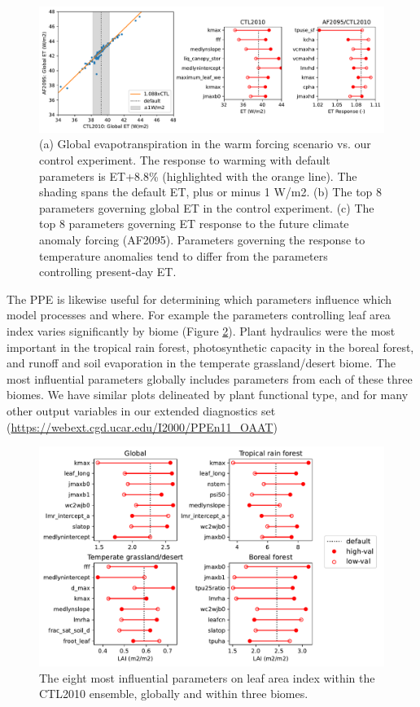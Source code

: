 \documentclass[draft]{agujournal2019}
\begin{document}
\begin{figure}[h]
\centering
\includegraphics[width=40pc]{../figs/ET_response.pdf}
\caption{(a) Global evapotranspiration in the warm forcing scenario vs. our control experiment. The response to warming with default parameters is ET+8.8\% (highlighted with the orange line). The shading spans the default ET, plus or minus 1 W/m2.
(b) The top 8 parameters governing global ET in the control experiment.
(c) The top 8 parameters governing ET response to the future climate anomaly forcing (AF2095).
Parameters governing the response to temperature anomalies tend to differ from the parameters controlling present-day ET.}
\label{fig:et}
\end{figure}

The PPE is likewise useful for determining which parameters influence which model processes and where. For example the parameters controlling leaf area index varies significantly by biome (Figure \ref{fig:lai}). Plant hydraulics were the most important in the tropical rain forest, photosynthetic capacity in the boreal forest, and runoff and soil evaporation in the temperate grassland/desert biome. The most influential parameters globally includes parameters from each of these three biomes. We have similar plots delineated by plant functional type, and for many other output variables in our extended diagnostics set (\url{https://webext.cgd.ucar.edu/I2000/PPEn11_OAAT}) 

\begin{figure}[h]
\centering
\includegraphics[width=40pc]{../figs/lai_biome.pdf}
\caption{The eight most influential parameters on leaf area index within the CTL2010 ensemble, globally and within three biomes.}
\label{fig:lai}
\end{figure}
\end{document}
